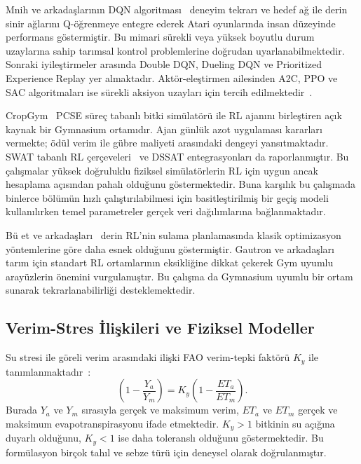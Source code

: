 \documentclass[10pt,twocolumn,a4paper]{article}
\begin{document}
Mnih ve arkada\c{s}lar{\i}n{\i}n DQN algoritmas{\i}~\cite{mnih2015human} deneyim tekrar{\i} ve hedef a\u{g} ile derin sinir a\u{g}lar{\i}n{\i} Q-\"o\u{g}renmeye entegre ederek Atari oyunlar{\i}nda insan d\"uzeyinde performans g\"ostermi\c{s}tir. Bu mimari s\"urekli veya y\"uksek boyutlu durum uzaylar{\i}na sahip tar{\i}msal kontrol problemlerine do\u{g}rudan uyarlanabilmektedir. Sonraki iyile\c{s}tirmeler aras{\i}nda Double DQN, Dueling DQN ve Prioritized Experience Replay yer almaktad{\i}r. Akt\"or-ele\c{s}tirmen ailesinden A2C, PPO ve SAC algoritmalar{\i} ise s\"urekli aksiyon uzaylar{\i} i\c{c}in tercih edilmektedir~\cite{wang2025fertilization}.

CropGym~\cite{overweg2021cropgym} PCSE s\"ure\c{c} tabanl{\i} bitki sim\"ulat\"or\"u ile RL ajan{\i}n{\i} birle\c{s}tiren a\c{c}{\i}k kaynak bir Gymnasium ortam{\i}d{\i}r. Ajan g\"unl\"uk azot uygulamas{\i} kararlar{\i} vermekte; \"od\"ul verim ile g\"ubre maliyeti aras{\i}ndaki dengeyi yans{\i}tmaktad{\i}r. SWAT tabanl{\i} RL \c{c}er\c{c}eveleri~\cite{madondo2023swat} ve DSSAT entegrasyonlar{\i} da raporlanm{\i}\c{s}t{\i}r. Bu \c{c}al{\i}\c{s}malar y\"uksek do\u{g}ruluklu fiziksel sim\"ulat\"orlerin RL i\c{c}in uygun ancak hesaplama a\c{c}{\i}s{\i}ndan pahal{\i} oldu\u{g}unu g\"ostermektedir. Buna kar\c{s}{\i}l{\i}k bu \c{c}al{\i}\c{s}mada binlerce b\"ol\"um\"un h{\i}zl{\i} \c{c}al{\i}\c{s}t{\i}r{\i}labilmesi i\c{c}in basitle\c{s}tirilmi\c{s} bir ge\c{c}i\c{s} modeli kullan{\i}l{\i}rken temel parametreler ger\c{c}ek veri da\u{g}{\i}l{\i}mlar{\i}na ba\u{g}lanmaktad{\i}r.

B\"u et ve arkada\c{s}lar{\i}~\cite{buet2022deep} derin RL'nin sulama planlamas{\i}nda klasik optimizasyon y\"ontemlerine g\"ore daha esnek oldu\u{g}unu g\"ostermi\c{s}tir. Gautron ve arkada\c{s}lar{\i}~\cite{gautron2022gym} tar{\i}m i\c{c}in standart RL ortamlar{\i}n{\i}n eksikli\u{g}ine dikkat \c{c}ekerek Gym uyumlu aray\"uzlerin \"onemini vurgulam{\i}\c{s}t{\i}r. Bu \c{c}al{\i}\c{s}ma da Gymnasium uyumlu bir ortam sunarak tekrarlanabilirli\u{g}i desteklemektedir.

\subsection{Verim-Stres \.{I}li\c{s}kileri ve Fiziksel Modeller}
Su stresi ile g\"oreli verim aras{\i}ndaki ili\c{s}ki FAO verim-tepki fakt\"or\"u $K_y$ ile tan{\i}mlanmaktad{\i}r~\cite{doorenbos1979}:
\begin{equation}
\left(1-\frac{Y_a}{Y_m}\right)=K_y\left(1-\frac{ET_a}{ET_m}\right).
\end{equation}
Burada $Y_a$ ve $Y_m$ s{\i}ras{\i}yla ger\c{c}ek ve maksimum verim, $ET_a$ ve $ET_m$ ger\c{c}ek ve maksimum evapotranspirasyonu ifade etmektedir. $K_y>1$ bitkinin su a\c{c}{\i}\u{g}{\i}na duyarl{\i} oldu\u{g}unu, $K_y<1$ ise daha toleransl{\i} oldu\u{g}unu g\"ostermektedir. Bu form\"ulasyon bir\c{c}ok tah{\i}l ve sebze t\"ur\"u i\c{c}in deneysel olarak do\u{g}rulanm{\i}\c{s}t{\i}r.
\end{document}
